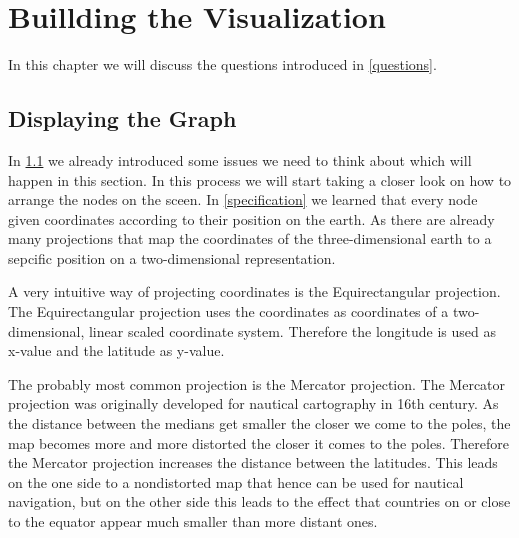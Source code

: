 \documentclass
[
	paper = a4,
    pagesize,
	12 pt,
	oneside,                       %
    open = right,
	DIV = calc,
	BCOR = 0 mm,                   %
	bibtotoc
]
{scrbook}
\begin{document}



\chapter{Buillding the Visualization} \label{main}

In this chapter we will discuss the questions introduced in \cref{questions}.


\section{Displaying the Graph} \label{graph}

In \cref{graph} we already introduced some issues we need to think about which will happen in this section.
In this process we will start taking a closer look on how to arrange the nodes on the sceen.
In \cref{specification} we learned that every node given coordinates according to their position on the earth.
As there are already many projections that map the coordinates of the three-dimensional earth to a sepcific position on a two-dimensional representation.

A very intuitive way of projecting coordinates is the Equirectangular projection.
The Equirectangular projection uses the coordinates as coordinates of a two-dimensional, linear scaled coordinate system. Therefore the longitude is used as x-value and the latitude as y-value.

The probably most common projection is the Mercator projection.
The Mercator projection was originally developed for nautical cartography in 16th century.
As the distance between the medians get smaller the closer we come to the poles, the map becomes more and more distorted the closer it comes to the poles.
Therefore the Mercator projection increases the distance between the latitudes.
This leads on the one side to a nondistorted map that hence can be used for nautical navigation, but on the other side this leads to the effect that countries on or close to the equator appear much smaller than more distant ones.

\end{document}

